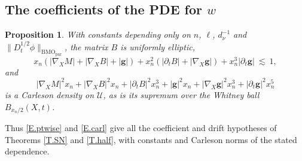 \documentclass[10pt,a4paper]{amsart}
\numberwithin{equation}{section}
\newcommand{\abs}[1]{\left\vert#1\right\vert}
\newcommand{\br}[1]{\left(#1\right)}
\newcommand{\pd}{\partial}
\newcommand{\dhalf}{D_t^{1/2}}
\newcommand{\BMOpar}{\mathrm{BMO}_{\mathrm{par}}}
\newcommand{\Uc}{\mathcal U}
\newtheorem{proposition}[equation]{Proposition}
\begin{document}
\subsection{The coefficients of the PDE for $w$}\label{ss.coeff}

\begin{proposition}\label{P.coeff}
With constants depending only on $n$, $\ell$, $d_\nu^{-1}$ and
$\|\dhalf\phi\|_{\BMOpar}$, the matrix $B$ is uniformly elliptic,
\begin{equation}\label{E.ptwise}
  x_n\br{\abs{\nabla_XM}+\abs{\nabla_XB}+\abs{\mathbf g}}
  +x_n^2\br{\abs{\pd_tB}+\abs{\nabla_X\mathbf g}}
  +x_n^3\abs{\pd_t\mathbf g}\ \lesssim\ 1 ,
\end{equation}
and
\begin{equation}\label{E.carl}
  \abs{\nabla_XM}^2x_n+\abs{\nabla_XB}^2x_n
  +\abs{\pd_tB}^2x_n^3+\abs{\mathbf g}^2x_n
  +\abs{\nabla_X\mathbf g}^2x_n^3
  +\abs{\pd_t\mathbf g}^2x_n^5
\end{equation}
is a Carleson density on $\Uc$, as is its supremum over the Whitney ball
$B_{x_n/2}(X,t)$.
\end{proposition}

\noindent Thus \eqref{E.ptwise} and \eqref{E.carl} give all the coefficient
and drift hypotheses of Theorems \ref{T.SN} and \ref{T.half}, with constants
and Carleson norms of the stated dependence.
\end{document}
